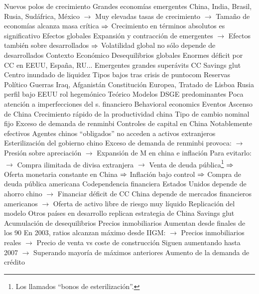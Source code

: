 \documentclass{nuevotema}
\begin{document}
\begin{esquemal}
			\3 Nuevos polos de crecimiento
				\4 Grandes economías emergentes
				\4[] China, India, Brasil, Rusia, Sudáfrica, México
				\4[] $\to$ Muy elevadas tasas de crecimiento
				\4[] $\to$ Tamaño de economías alcanza masa crítica
				\4[] $\then$ Crecimiento en términos absolutos es significativo
				\4 Efectos globales
				\4[] Expansión y contracción de emergentes
				\4[] $\to$ Efectos también sobre desarrollados
				\4[] $\then$ Volatilidad global no sólo depende de desarrollados
	\1 
		\2 Contexto
			\3 Económico
				\4 Desequilibrios globales
				\4[] Enormes déficit por CC en EEUU, España, RU...
				\4[] Emergentes grandes superávits CC
				\4 Savings glut
				\4[] Centro inundado de liquidez
				\4[] Tipos bajos tras crisis de puntocom
				\4 Reservas
			\3 Político
				\4 Guerras Iraq, Afganistán
				\4 Constitución Europea, Tratado de Lisboa
				\4 Rusia perfil bajo
				\4 EEUU rol hegemónico
			\3 Teórico
				\4 Modelos DSGE predominantes
				\4 Poca atención a imperfecciones del s. financiero
				\4 Behavioral economics
		\2 Eventos
			\3 Ascenso de China
				\4 Crecimiento rápido de la productividad china
				\4 Tipo de cambio nominal fijo
				\4 Exceso de demanda de renminbi
				\4 Controles de capital en China
				\4[] Notablemente efectivos
				\4[] Agentes chinos ``obligados'' no acceden a activos extranjeros
				\4 Esterilización del gobierno chino
				\4[] Exceso de demanda de renminbi provoca:
				\4[] $\to$ Presión sobre apreciación
				\4[] $\to$ Expansión de M en china e inflación
				\4[] Para evitarlo:
				\4[] $\to$ Compra ilimitada de divisa extranjera
				\4[] $\to$ Venta de deuda pública\footnote{Los llamados ``bonos de esterilización''.}
				\4[] $\then$ Oferta monetaria constante en China
				\4[] $\then$ Inflación bajo control
				\4[] $\then$ Compra de deuda pública americana
				\4 Codependencia financiera
				\4[] Estados Unidos depende de ahorro chino
				\4[] $\to$ Financiar déficit de CC
				\4[] China depende de mercados financieros americanos
				\4[] $\to$ Oferta de activo libre de riesgo muy líquido
				\4 Replicación del modelo
				\4[] Otros países en desarrollo replican estrategia de China
				\4[$\then$] Savings glut
			\3 Acumulación de desequilibrios
				\4 Precios inmobiliarios
				\4[] Aumentan desde finales de los 90
				\4[] En 2003, ratios alcanzan máximo desde IIGM:
				\4[] $\to$ Precios inmobiliarios reales
				\4[] $\to$ Precio de venta vs coste de construcción
				\4[] Siguen aumentando hasta 2007
				\4[] $\to$ Superando mayoría de máximos anteriores
				\4[] Aumento de la demanda de crédito

\end{esquemal}
\end{document}
